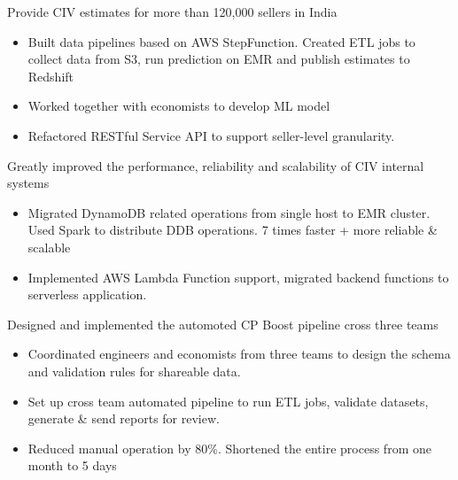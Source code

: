 \documentclass[10pt,a4paper,ragged2e,withhyper]{altacv}
\begin{document}
\begin{paracol}{2}


   {Provide CIV estimates for more than 120,000 sellers in India}
  \begin{itemize}
    \item Built data pipelines based on AWS StepFunction. Created ETL jobs to collect data from S3, run prediction on EMR and publish estimates to Redshift
    \item Worked together with economists to develop ML model
    \item Refactored RESTful Service API to support seller-level granularity.
  \end{itemize}

   {Greatly improved the performance, reliability and scalability of CIV internal systems}
  \begin{itemize}
    \item Migrated DynamoDB related operations from single host to EMR cluster. Used Spark to distribute DDB operations. 7 times faster + more reliable \& scalable
    \item Implemented AWS Lambda Function support, migrated backend functions to serverless application.
  \end{itemize}

   {Designed and implemented the automoted CP Boost pipeline cross three teams}
  \begin{itemize}
    \item Coordinated engineers and economists from three teams to design the schema and validation rules for shareable data.
    \item Set up cross team automated pipeline to run ETL jobs, validate datasets, generate \& send reports for review.
    \item Reduced manual operation by 80\%. Shortened the entire process from one month to 5 days
  \end{itemize}

  \divider


\end{paracol}
\end{document}

